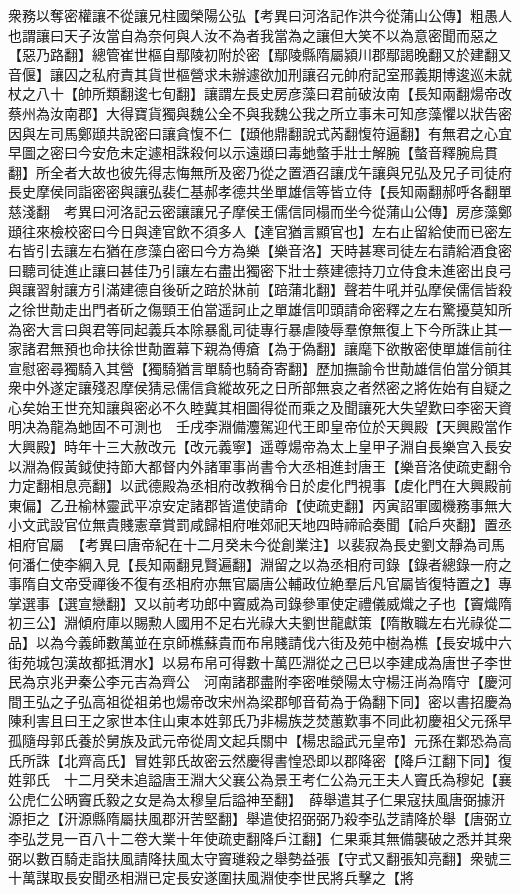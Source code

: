 衆務以奪密權讓不從讓兄柱國榮陽公弘【考異曰河洛記作洪今從蒲山公傳】粗愚人也謂讓曰天子汝當自為奈何與人汝不為者我當為之讓但大笑不以為意密聞而惡之【惡乃路翻】總管崔世樞自鄢陵初附於密【鄢陵縣隋屬潁川郡鄢謁晚翻又於建翻又音偃】讓囚之私府責其貨世樞營求未辦遽欲加刑讓召元帥府記室邢義期博逡巡未就杖之八十【帥所類翻逡七旬翻】讓謂左長史房彦藻曰君前破汝南【長知兩翻煬帝改蔡州為汝南郡】大得寶貨獨與魏公全不與我魏公我之所立事未可知彦藻懼以狀告密因與左司馬鄭頲共說密曰讓貪愎不仁【頲他鼎翻說式芮翻愎符逼翻】有無君之心宜早圖之密曰今安危未定遽相誅殺何以示遠頲曰毒虵螫手壯士解腕【螫音釋腕烏貫翻】所全者大故也彼先得志悔無所及密乃從之置酒召讓戊午讓與兄弘及兄子司徒府長史摩侯同詣密密與讓弘裴仁基郝孝德共坐單雄信等皆立侍【長知兩翻郝呼各翻單慈淺翻　考異曰河洛記云密讓讓兄子摩侯王儒信同榻而坐今從蒲山公傳】房彦藻鄭頲往來檢校密曰今日與達官飲不須多人【達官猶言顯官也】左右止留給使而已密左右皆引去讓左右猶在彦藻白密曰今方為樂【樂音洛】天時甚寒司徒左右請給酒食密曰聽司徒進止讓曰甚佳乃引讓左右盡出獨密下壯士蔡建德持刀立侍食未進密出良弓與讓習射讓方引滿建德自後斫之踣於牀前【踣蒲北翻】聲若牛吼并弘摩侯儒信皆殺之徐世勣走出門者斫之傷頸王伯當遥訶止之單雄信叩頭請命密釋之左右驚擾莫知所為密大言曰與君等同起義兵本除暴亂司徒專行暴虐陵辱羣僚無復上下今所誅止其一家諸君無預也命扶徐世勣置幕下親為傅瘡【為于偽翻】讓麾下欲散密使單雄信前往宣慰密尋獨騎入其營【獨騎猶言單騎也騎奇寄翻】歷加撫諭令世勣雄信伯當分領其衆中外遂定讓殘忍摩侯猜忌儒信貪縱故死之日所部無哀之者然密之將佐始有自疑之心矣始王世充知讓與密必不久睦冀其相圖得從而乘之及聞讓死大失望歎曰李密天資明决為龍為虵固不可測也　壬戌李淵備灋駕迎代王即皇帝位於天興殿【天興殿當作大興殿】時年十三大赦改元【改元義寧】遥尊煬帝為太上皇甲子淵自長樂宫入長安以淵為假黃鉞使持節大都督内外諸軍事尚書令大丞相進封唐王【樂音洛使疏吏翻令力定翻相息亮翻】以武德殿為丞相府改教稱令日於䖍化門視事【䖍化門在大興殿前東偏】乙丑榆林靈武平凉安定諸郡皆遣使請命【使疏吏翻】丙寅詔軍國機務事無大小文武設官位無貴賤憲章賞罰咸歸相府唯郊祀天地四時禘祫奏聞【祫戶夾翻】置丞相府官屬　【考異曰唐帝紀在十二月癸未今從創業注】以裴寂為長史劉文靜為司馬何潘仁使李綱入見【長知兩翻見賢遍翻】淵留之以為丞相府司錄【錄者總錄一府之事隋自文帝受禪後不復有丞相府亦無官屬唐公輔政位絶羣后凡官屬皆復特置之】專掌選事【選宣戀翻】又以前考功郎中竇威為司錄參軍使定禮儀威熾之子也【竇熾隋初三公】淵傾府庫以賜勲人國用不足右光祿大夫劉世龍獻策【隋散職左右光祿從二品】以為今義師數萬並在京師樵蘇貴而布帛賤請伐六街及苑中樹為樵【長安城中六街苑城包漢故都抵渭水】以易布帛可得數十萬匹淵從之己巳以李建成為唐世子李世民為京兆尹秦公李元吉為齊公　河南諸郡盡附李密唯滎陽太守楊汪尚為隋守【慶河間王弘之子弘高祖從祖弟也煬帝改宋州為梁郡郇音荀為于偽翻下同】密以書招慶為陳利害且曰王之家世本住山東本姓郭氏乃非楊族芝焚蕙歎事不同此初慶祖父元孫早孤隨母郭氏養於舅族及武元帝從周文起兵關中【楊忠謚武元皇帝】元孫在鄴恐為高氏所誅【北齊高氏】冒姓郭氏故密云然慶得書惶恐即以郡降密【降戶江翻下同】復姓郭氏　十二月癸未追謚唐王淵大父襄公為景王考仁公為元王夫人竇氏為穆妃【襄公虎仁公昞竇氏毅之女是為太穆皇后謚神至翻】　薛舉遣其子仁果寇扶風唐弼據汧源拒之【汧源縣隋屬扶風郡汧苦堅翻】舉遣使招弼弼乃殺李弘芝請降於舉【唐弼立李弘芝見一百八十二卷大業十年使疏吏翻降戶江翻】仁果乘其無備襲破之悉并其衆弼以數百騎走詣扶風請降扶風太守竇璡殺之舉勢益張【守式又翻張知亮翻】衆號三十萬謀取長安聞丞相淵已定長安遂圍扶風淵使李世民將兵擊之【將